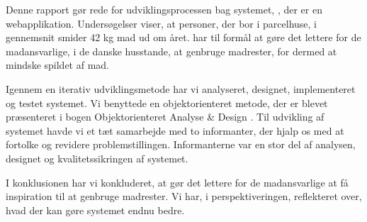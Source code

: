 Denne rapport gør rede for udviklingsprocessen bag systemet, \Foodl{}, der er en webapplikation. 
Undersøgelser viser, at personer, der bor i parcelhuse, i gennemsnit smider 42 kg mad ud om året.
\Foodl{} har til formål at gøre det lettere for de madansvarlige, i de danske husstande, at genbruge madrester, for dermed at mindske spildet af mad.

Igennem en iterativ udviklingsmetode har vi analyseret, designet, implementeret og testet systemet.
Vi benyttede en objektorienteret metode, der er blevet præsenteret i bogen Objektorienteret Analyse \& Design \cite{ooad}.
Til udvikling af systemet havde vi et tæt samarbejde med to informanter, der hjalp os med at fortolke og revidere problemstillingen. Informanterne var en stor del af analysen, designet og kvalitetssikringen af systemet.

I konklusionen har vi konkluderet, at \Foodl{} gør det lettere for de madansvarlige at få inspiration til at genbruge madrester.
Vi har, i perspektiveringen, reflekteret over, hvad der kan gøre systemet endnu bedre.